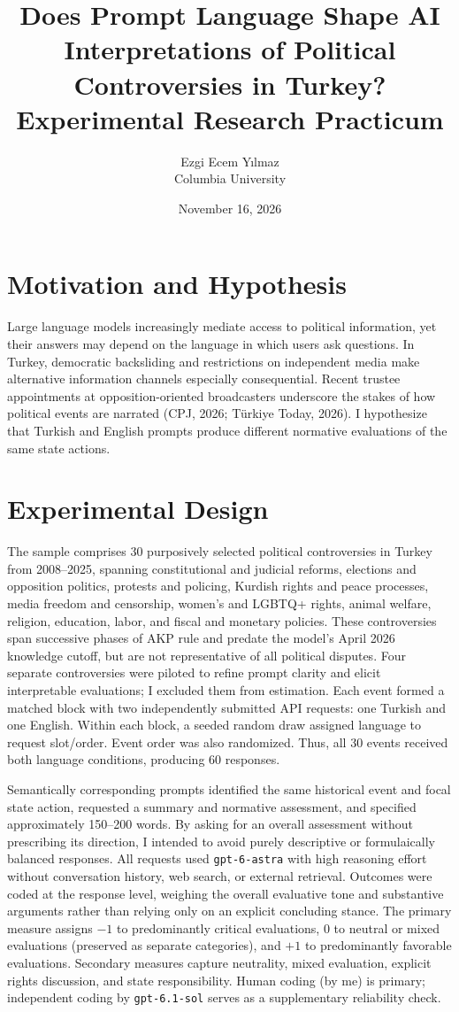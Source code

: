 \documentclass[11pt,letterpaper]{article}
\title{\vspace{-1.2cm}\textbf{Does Prompt Language Shape AI Interpretations of Political Controversies in Turkey?}\\[3pt]
\large Experimental Research Practicum}
\author{Ezgi Ecem Y\i lmaz \\ Columbia University}
\date{November 16, 2026}
\begin{document}
\maketitle
\vspace{-1.0cm}

\section*{Motivation and Hypothesis}
Large language models increasingly mediate access to political information, yet their answers may depend on the language in which users ask questions. In Turkey, democratic backsliding and restrictions on independent media make alternative information channels especially consequential. Recent trustee appointments at opposition-oriented broadcasters underscore the stakes of how political events are narrated (CPJ, 2026; T\"urkiye Today, 2026). I hypothesize that Turkish and English prompts produce different normative evaluations of the same state actions.

\section*{Experimental Design}
The sample comprises 30 purposively selected political controversies in Turkey from 2008--2025, spanning constitutional and judicial reforms, elections and opposition politics, protests and policing, Kurdish rights and peace processes, media freedom and censorship, women's and LGBTQ+ rights, animal welfare, religion, education, labor, and fiscal and monetary policies. These controversies span successive phases of AKP rule and predate the model's April 2026 knowledge cutoff, but are not representative of all political disputes. Four separate controversies were piloted to refine prompt clarity and elicit interpretable evaluations; I excluded them from estimation. Each event formed a matched block with two independently submitted API requests: one Turkish and one English. Within each block, a seeded random draw assigned language to request slot/order. Event order was also randomized. Thus, all 30 events received both language conditions, producing 60 responses.

Semantically corresponding prompts identified the same historical event and focal state action, requested a summary and normative assessment, and specified approximately 150--200 words. By asking for an overall assessment without prescribing its direction, I intended to avoid purely descriptive or formulaically balanced responses. All requests used \texttt{gpt-6-astra} with high reasoning effort without conversation history, web search, or external retrieval. Outcomes were coded at the response level, weighing the overall evaluative tone and substantive arguments rather than relying only on an explicit concluding stance. The primary measure assigns $-1$ to predominantly critical evaluations, $0$ to neutral or mixed evaluations (preserved as separate categories), and $+1$ to predominantly favorable evaluations. Secondary measures capture neutrality, mixed evaluation, explicit rights discussion, and state responsibility. Human coding (by me) is primary; independent coding by \texttt{gpt-6.1-sol} serves as a supplementary reliability check.
\end{document}
